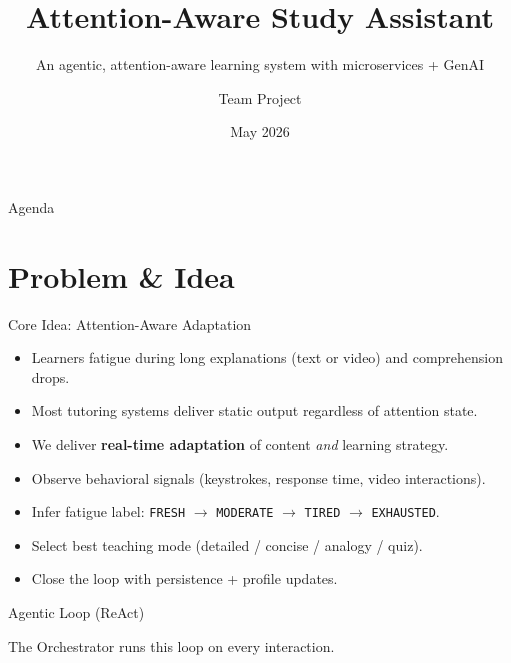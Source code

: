 \documentclass{sdqbeamer}
\title[Attention-Aware Study Assistant]{Attention-Aware Study Assistant}
\subtitle{An agentic, attention-aware learning system with microservices + GenAI}
\author[Team]{Team Project}\date{May 2026}
\begin{document}
\KITtitleframe

\begin{frame}{Agenda}
  \tableofcontents
\end{frame}

\section{Problem \& Idea}

\begin{frame}{Core Idea: Attention-Aware Adaptation}
\begin{itemize}
  \item Learners fatigue during long explanations (text or video) and comprehension drops.
  \item Most tutoring systems deliver static output regardless of attention state.
  \item We deliver \textbf{real-time adaptation} of content \emph{and} learning strategy.
  \item Observe behavioral signals (keystrokes, response time, video interactions).
  \item Infer fatigue label: \texttt{FRESH} $\rightarrow$ \texttt{MODERATE} $\rightarrow$ \texttt{TIRED} $\rightarrow$ \texttt{EXHAUSTED}.
  \item Select best teaching mode (detailed / concise / analogy / quiz).
  \item Close the loop with persistence + profile updates.
\end{itemize}
\end{frame}

\begin{frame}{Agentic Loop (ReAct)}
\centering
{}
\vspace{2mm}

\small The Orchestrator runs this loop on every interaction.
\end{frame}
\end{document}
